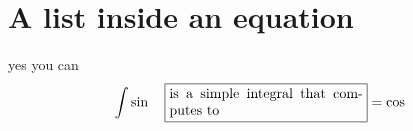 \section*{A list inside an equation}%
yes you can
\begin{equation}
 \int \sin \quad \text{\fbox{\parbox{0.4\textwidth}{ is a simple integral that computes to   }}} =\cos
\end{equation}







